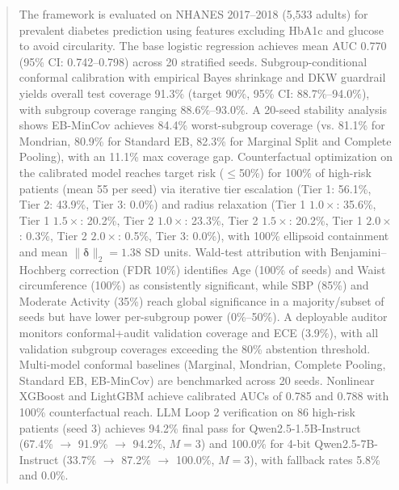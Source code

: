 \documentclass[11pt,a4paper]{article}
\theoremstyle{plain}
\begin{document}
\begin{abstract}
The framework is evaluated on NHANES 2017--2018 (5,533 adults) for prevalent diabetes prediction using features excluding HbA1c and glucose to avoid circularity. The base logistic regression achieves mean AUC 0.770 (95\% CI: 0.742--0.798) across 20 stratified seeds. Subgroup-conditional conformal calibration with empirical Bayes shrinkage and DKW guardrail yields overall test coverage 91.3\% (target 90\%, 95\% CI: 88.7\%--94.0\%), with subgroup coverage ranging 88.6\%--93.0\%. A 20-seed stability analysis shows EB-MinCov achieves 84.4\% worst-subgroup coverage (vs. 81.1\% for Mondrian, 80.9\% for Standard EB, 82.3\% for Marginal Split and Complete Pooling), with an 11.1\% max coverage gap. Counterfactual optimization on the calibrated model reaches target risk ($\le$50\%) for 100\% of high-risk patients (mean 55 per seed) via iterative tier escalation (Tier 1: 56.1\%, Tier 2: 43.9\%, Tier 3: 0.0\%) and radius relaxation (Tier 1 $1.0\times$: 35.6\%, Tier 1 $1.5\times$: 20.2\%, Tier 2 $1.0\times$: 23.3\%, Tier 2 $1.5\times$: 20.2\%, Tier 1 $2.0\times$: 0.3\%, Tier 2 $2.0\times$: 0.5\%, Tier 3: 0.0\%), with 100\% ellipsoid containment and mean $\|\boldsymbol{\delta}\|_2 = 1.38$ SD units. Wald-test attribution with Benjamini--Hochberg correction (FDR 10\%) identifies Age (100\% of seeds) and Waist circumference (100\%) as consistently significant, while SBP (85\%) and Moderate Activity (35\%) reach global significance in a majority/subset of seeds but have lower per-subgroup power (0\%--50\%). A deployable auditor monitors conformal+audit validation coverage and ECE (3.9\%), with all validation subgroup coverages exceeding the 80\% abstention threshold. Multi-model conformal baselines (Marginal, Mondrian, Complete Pooling, Standard EB, EB-MinCov) are benchmarked across 20 seeds. Nonlinear XGBoost and LightGBM achieve calibrated AUCs of 0.785 and 0.788 with 100\% counterfactual reach. %
LLM Loop 2 verification on 86 high-risk patients (seed 3) achieves 94.2\% final pass for Qwen2.5-1.5B-Instruct (67.4\% $\to$ 91.9\% $\to$ 94.2\%, $M=3$) and 100.0\% for 4-bit Qwen2.5-7B-Instruct (33.7\% $\to$ 87.2\% $\to$ 100.0\%, $M=3$), with fallback rates 5.8\% and 0.0\%.
\end{abstract}
\end{document}

